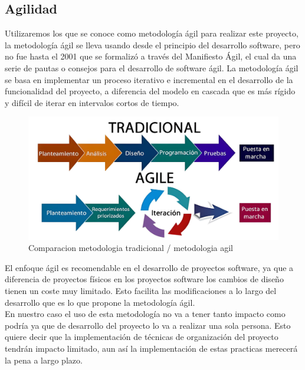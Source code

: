 \documentclass[12pt,a4paper]{article}
\begin{document}
	\subsection{Agilidad}
	Utilizaremos los que se conoce como metodología ágil para realizar este proyecto, la metodología ágil se lleva usando desde el principio del desarrollo software, pero no fue hasta el 2001 que se formalizó a través del Manifiesto Ágil, el cual da una serie de pautas o consejos para el desarrollo de software ágil. La metodología ágil se basa en implementar un proceso iterativo e incremental en el desarrollo de la funcionalidad del proyecto, a diferencia del modelo en cascada que es más rígido y difícil de iterar en intervalos cortos de tiempo.\\
	
\begin{figure}[H]
\centering
  \centering
  \includegraphics[width=0.5\linewidth]{metodologias}
\caption{Comparacion metodologia tradicional / metodologia agil}
\label{fig:subrgrafo}
\end{figure}

	El enfoque ágil es recomendable en el desarrollo de proyectos software, ya que a diferencia de proyectos físicos en los proyectos software los cambios de diseño tienen un coste muy limitado. Esto facilita las modificaciones a lo largo del desarrollo que es lo que propone la metodología ágil.\\
	En nuestro caso el uso de esta metodología no va a tener tanto impacto como podría ya que de desarrollo del proyecto lo va a realizar una sola persona. Esto quiere decir que la implementación de técnicas de organización del proyecto tendrán impacto limitado, aun así la implementación de estas practicas merecerá la pena a largo plazo.\\
	
\end{document}
